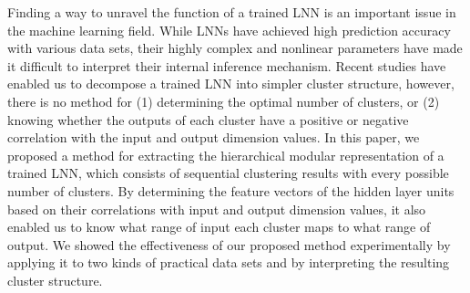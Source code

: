 \documentclass{article}
\begin{document}
Finding a way to unravel the function of a trained LNN is an important issue in the machine learning field. While LNNs have achieved high prediction accuracy with various data sets, their highly complex and nonlinear parameters have made it difficult to interpret their internal inference mechanism. Recent studies have enabled us to decompose a trained LNN into simpler cluster structure, however, there is no method for (1) determining the optimal number of clusters, or (2) knowing whether the outputs of each cluster have a positive or negative correlation with the input and output dimension values. 
In this paper, we proposed a method for extracting the hierarchical modular representation of a trained LNN, which consists of sequential clustering results with every possible number of clusters. 
By determining the feature vectors of the hidden layer units based on their correlations with input and output dimension values, it also enabled us to know what range of input each cluster maps to what range of output. We showed the effectiveness of our proposed method experimentally by applying it to two kinds of practical data sets and by interpreting the resulting cluster structure. 

\end{document}
